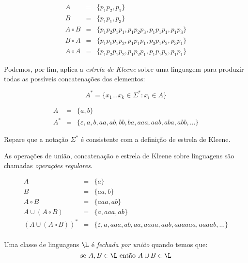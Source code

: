 \begin{example}
  \begin{eqnarray*}
    A & = & \{p_1p_2, p_1\}\\
    B & = & \{p_1p_1, p_3\}\\
    A \circ B & = & \{p_1p_2p_1p_1, p_1p_2p_3, p_1p_1p_1, p_1p_3\}\\
    B \circ A & = & \{p_1p_1p_1p_2, p_1p_1p_1, p_3p_1p_2, p_3p_1\}\\
    A \circ A & = & \{p_1p_2p_1p_2, p_1p_2p_1, p_1p_1p_2, p_1p_1\}
  \end{eqnarray*}
\end{example}

Podemos, por fim, aplica a {\em estrela de Kleene} sobre uma linguagem para produzir todas as possíveis concatenações dos elementos:

\begin{displaymath}
  A^* = \{x_1 \dots x_k \in \Sigma^* : x_i \in A \}
\end{displaymath}


\begin{example}
  \begin{eqnarray*}
    A & = & \{a,b\}\\
    A^* & = & \{\varepsilon, a, b, aa, ab, bb, ba, aaa, aab, aba, abb, \dots\}
  \end{eqnarray*}
\end{example}

Repare que a notação $\Sigma^*$ é consistente com a definição de estrela de Kleene.

As operações de união, concatenação e estrela de Kleene sobre linguagens são chamadas {\em operações regulares}.

\begin{example}
  \begin{eqnarray*}
    A & = & \{a\}\\
    B & = & \{aa, b\}\\
    A \circ B & = & \{aaa, ab\}\\
    A \cup (A \circ B) & = & \{a, aaa, ab\}\\
    (A \cup (A \circ B))^* & = & \{\varepsilon, a, aaa, ab, aa, aaaa, aab, aaaaaa, aaaab, \dots \}\\
  \end{eqnarray*}
\end{example}

Uma classe de linguagens $\L$ é {\em fechada por união} quando temos que:
\begin{displaymath}
\textrm{se }  A, B \in \L \textrm{ então } A \cup B \in \L
\end{displaymath}

